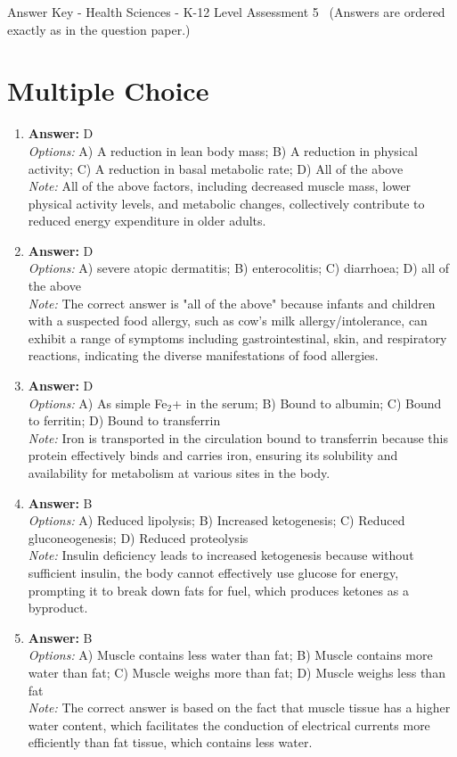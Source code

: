 \documentclass[12pt]{article}
\begin{document}
\begin{center}
Answer Key - Health Sciences - K-12 Level Assessment 5 \
\small (Answers are ordered exactly as in the question paper.)
\end{center}

\section*{Multiple Choice}
\begin{enumerate}[label=\arabic*.]
\item \textbf{Answer:} D
\\ \textit{Options:} A) A reduction in lean body mass; B) A reduction in physical activity; C) A reduction in basal metabolic rate; D) All of the above
\\ \textit{Note:} All of the above factors, including decreased muscle mass, lower physical activity levels, and metabolic changes, collectively contribute to reduced energy expenditure in older adults.
\item \textbf{Answer:} D
\\ \textit{Options:} A) severe atopic dermatitis; B) enterocolitis; C) diarrhoea; D) all of the above
\\ \textit{Note:} The correct answer is "all of the above" because infants and children with a suspected food allergy, such as cow's milk allergy/intolerance, can exhibit a range of symptoms including gastrointestinal, skin, and respiratory reactions, indicating the diverse manifestations of food allergies.
\item \textbf{Answer:} D
\\ \textit{Options:} A) As simple Fe$_{2}$+ in the serum; B) Bound to albumin; C) Bound to ferritin; D) Bound to transferrin
\\ \textit{Note:} Iron is transported in the circulation bound to transferrin because this protein effectively binds and carries iron, ensuring its solubility and availability for metabolism at various sites in the body.
\item \textbf{Answer:} B
\\ \textit{Options:} A) Reduced lipolysis; B) Increased ketogenesis; C) Reduced gluconeogenesis; D) Reduced proteolysis
\\ \textit{Note:} Insulin deficiency leads to increased ketogenesis because without sufficient insulin, the body cannot effectively use glucose for energy, prompting it to break down fats for fuel, which produces ketones as a byproduct.
\item \textbf{Answer:} B
\\ \textit{Options:} A) Muscle contains less water than fat; B) Muscle contains more water than fat; C) Muscle weighs more than fat; D) Muscle weighs less than fat
\\ \textit{Note:} The correct answer is based on the fact that muscle tissue has a higher water content, which facilitates the conduction of electrical currents more efficiently than fat tissue, which contains less water.
\end{enumerate}
\end{document}
